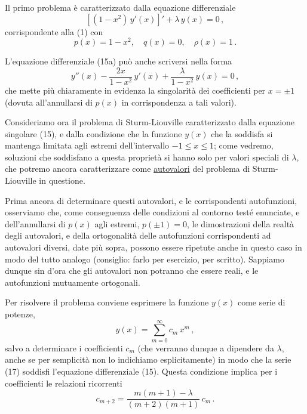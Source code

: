 \documentclass[11pt, a4paper]{book}
\numberwithin{equation}{section}
\begin{document}
Il primo problema è caratterizzato dalla equazione differenziale
\begin{equation}
\left[(1-x^2)\,y'(x)\right]'+\lambda\,y(x)=0\,, \tag{15a}
\end{equation}
corrispondente alla (1) con
\begin{equation}
p(x)=1-x^2,\quad q(x)=0,\quad\rho(x)=1\,. \tag{16}
\end{equation}

L'equazione differenziale (15a) può anche scriversi nella forma
\begin{equation}
y''(x)-\frac{2x}{1-x^2}\,y'(x)+\frac{\lambda}{1-x^2}\,y(x)=0\,, \tag{15b}
\end{equation}
che mette più chiaramente in evidenza la singolarità dei coefficienti per $x=\pm 1$ (dovuta all'annullarsi di $p(x)$ in corrispondenza a tali valori).

Consideriamo ora il problema di Sturm-Liouville caratterizzato dalla equazione singolare (15), e dalla condizione che la funzione $y(x)$ che la soddisfa si mantenga limitata agli estremi dell'intervallo $-1\leq x\leq 1$; come vedremo, soluzioni che soddisfano a questa proprietà si hanno solo per valori speciali di $\lambda$, che potremo ancora caratterizzare come \uline{autovalori} del problema di Sturm-Liouville in questione.

Prima ancora di determinare questi autovalori, e le corrispondenti autofunzioni, osserviamo che, come conseguenza delle condizioni al contorno testé enunciate, e dell'annullarsi di $p(x)$ agli estremi, $p(\pm 1)=0$, le dimostrazioni della realtà degli autovalori, e della ortogonalità delle autofunzioni corrispondenti ad autovalori diversi, date più sopra, possono essere ripetute anche in questo caso in modo del tutto analogo (consiglio: farlo per esercizio, per scritto). Sappiamo dunque sin d'ora che gli autovalori non potranno che essere reali, e le autofunzioni mutuamente ortogonali.

Per risolvere il problema conviene esprimere la funzione $y(x)$ come serie di potenze,
\begin{equation}
y(x)=\sum_{m=0}^{\infty}c_m\,x^m\,, \tag{17}
\end{equation}
salvo a determinare i coefficienti $c_m$ (che verranno dunque a dipendere da $\lambda$, anche se per semplicità non lo indichiamo esplicitamente) in modo che la serie (17) soddisfi l'equazione differenziale (15). Questa condizione implica per i coefficienti le relazioni ricorrenti
\[
c_{m+2} = \frac{m(m+1)-\lambda}{(m+2)(m+1)}\, c_m \,. \tag{18}
\]
\end{document}
